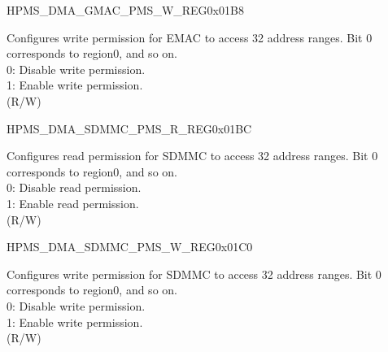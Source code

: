 \begin{register}{H}{PMS\_DMA\_GMAC\_PMS\_W\_REG}{0x01B8}\label{regdesc:PMSDMAGMACPMSWREG}
%
\regnewline%
\begin{regdesc}\begin{reglist}
\label{fielddesc:PMSDMAGMACWPMS}\item [PMS\_DMA\_GMAC\_W\_PMS] Configures write permission for EMAC to access 32 address ranges. Bit 0 corresponds to region0, and so on.\\
0: Disable write permission.\\
1: Enable write permission.\\ (R/W)
\end{reglist}\end{regdesc}
\end{register}


\begin{register}{H}{PMS\_DMA\_SDMMC\_PMS\_R\_REG}{0x01BC}\label{regdesc:PMSDMASDMMCPMSRREG}
%
\regnewline%
\begin{regdesc}\begin{reglist}
\label{fielddesc:PMSDMASDMMCRPMS}\item [PMS\_DMA\_SDMMC\_R\_PMS] Configures read permission for SDMMC to access 32 address ranges. Bit 0 corresponds to region0, and so on.\\
0: Disable read permission.\\
1: Enable read permission.\\ (R/W)
\end{reglist}\end{regdesc}
\end{register}


\begin{register}{H}{PMS\_DMA\_SDMMC\_PMS\_W\_REG}{0x01C0}\label{regdesc:PMSDMASDMMCPMSWREG}
%
\regnewline%
\begin{regdesc}\begin{reglist}
\label{fielddesc:PMSDMASDMMCWPMS}\item [PMS\_DMA\_SDMMC\_W\_PMS] Configures write permission for SDMMC to access 32 address ranges. Bit 0 corresponds to region0, and so on.\\
0: Disable write permission.\\
1: Enable write permission.\\ (R/W)
\end{reglist}\end{regdesc}
\end{register}


